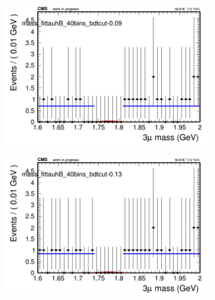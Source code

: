 \begin{figure}[H]
\begin{subfigure}{0.2\textwidth}
        \caption{}
    \end{subfigure}
    \begin{subfigure}{0.2\textwidth}
        \includegraphics[width=\textwidth]{flat_fit/plots/tauhB/massfit_tauhB_40bins_bdtcut-0.09.png}
        \caption{}
    \end{subfigure}
    \begin{subfigure}{0.2\textwidth}
        \includegraphics[width=\textwidth]{flat_fit/plots/tauhB/massfit_tauhB_40bins_bdtcut-0.13.png}
        \caption{}
    \end{subfigure}
    \begin{subfigure}{0.2\textwidth}

\end{subfigure}
\end{figure}
